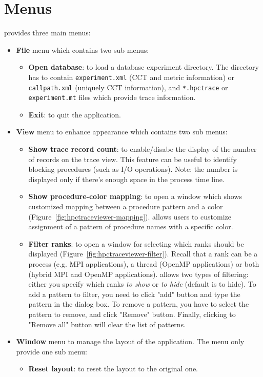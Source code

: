 \section{Menus}
\hpctraceviewer{} provides three main menus:
\begin{itemize}
 \item \textbf{File} menu which contains two sub menus:
 \begin{itemize}
   \item \textbf{Open database}: to load a database experiment directory. The directory has to contain \texttt{experiment.xml} (CCT and metric information) or \texttt{callpath.xml} (uniquely CCT information), and \texttt{*.hpctrace} or \texttt{experiment.mt} files which provide trace information.
   \item \textbf{Exit}: to quit the application.
 \end{itemize}
 \item \textbf{View} menu to enhance appearance which contains two sub menus:
 \begin{itemize}
   \item \textbf{Show trace record count}: to enable/disabe the display of the number of records on the trace view. This feature can be useful to identify blocking procedures (such as I/O operations). Note: the number is displayed only if there's enough space in the process time line.
   \item \textbf{Show procedure-color mapping}: to open a window which shows customized mapping between a procedure pattern and a color (Figure~\ref{fig:hpctraceviewer-mapping}). \hpctraceviewer{} allows users to customize assignment of a pattern of procedure names with a specific color.
   \item \textbf{Filter ranks}: to open a window for selecting which ranks should be displayed (Figure~\ref{fig:hpctraceviewer-filter}). Recall that a rank can be a process (e.g. MPI applications), a thread (OpenMP applications) or both (hybrid MPI and OpenMP applications). \hpctraceviewer{} allows two types of filtering: either you specify which ranks \textit{to show} or \textit{to hide} (default is to hide). 
To add a pattern to filter, you need to click "add" button and type the pattern in the dialog box. To remove a pattern, you have to select the pattern to remove, and click "Remove" button. Finally, clicking to "Remove all" button will clear the list of patterns.
 \end{itemize}
 \item \textbf{Window} menu to manage the layout of the application. The menu only provide one sub menu:
 \begin{itemize}
  \item \textbf{Reset layout}: to reset the layout to the original one.
 \end{itemize}
\end{itemize}


